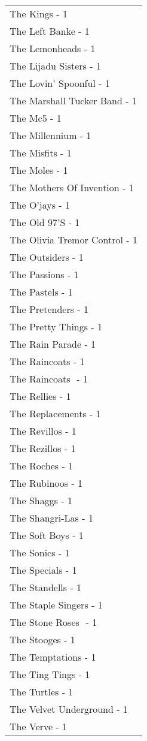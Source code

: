 \documentclass[
]{article}
\begin{document}
\begin{longtable}{l}
The Kings - 1 \\ 
The Left Banke - 1 \\ 
The Lemonheads - 1 \\ 
The Lijadu Sisters - 1 \\ 
The Lovin' Spoonful - 1 \\ 
The Marshall Tucker Band - 1 \\ 
The Mc5 - 1 \\ 
The Millennium - 1 \\ 
The Misfits - 1 \\ 
The Moles - 1 \\ 
The Mothers Of Invention - 1 \\ 
The O'jays - 1 \\ 
The Old 97'S - 1 \\ 
The Olivia Tremor Control - 1 \\ 
The Outsiders - 1 \\ 
The Passions - 1 \\ 
The Pastels - 1 \\ 
The Pretenders - 1 \\ 
The Pretty Things - 1 \\ 
The Rain Parade - 1 \\ 
The Raincoats - 1 \\ 
The Raincoats ‎ - 1 \\ 
The Rellies - 1 \\ 
The Replacements - 1 \\ 
The Revillos - 1 \\ 
The Rezillos - 1 \\ 
The Roches - 1 \\ 
The Rubinoos - 1 \\ 
The Shaggs - 1 \\ 
The Shangri-Las - 1 \\ 
The Soft Boys - 1 \\ 
The Sonics - 1 \\ 
The Specials - 1 \\ 
The Standells - 1 \\ 
The Staple Singers - 1 \\ 
The Stone Roses ‎ - 1 \\ 
The Stooges - 1 \\ 
The Temptations - 1 \\ 
The Ting Tings - 1 \\ 
The Turtles - 1 \\ 
The Velvet Underground - 1 \\ 
The Verve - 1 \\ 

\end{longtable}
\end{document}
